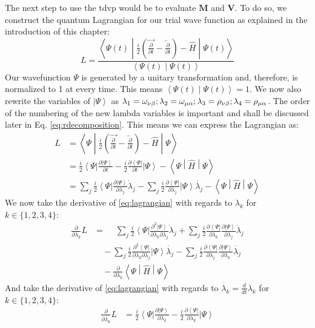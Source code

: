 \documentclass{aux/ttuthes2007}
\newcommand{\bra}[1]{\ensuremath{\left\langle#1\right\vert}}
\newcommand{\ket}[1]{\ensuremath{\left|#1\right\rangle}}
\newcommand{\braket}[2]{\left< #1 \middle\vert #2 \right>}
\newcommand{\sandwich}[3]{\left< #1 \middle\vert #2 \middle\vert #3 \right>}
\newcommand{\dd}[1]{\frac{d}{d#1}}
\newcommand{\pd}[1]{\frac{\partial}{\partial #1}}
\newcommand{\kpp}[1]{\frac{\partial \ket\Psi}{\partial #1}}
\newcommand{\bpp}[1]{\frac{\partial \bra\Psi}{\partial #1}}
\newcommand{\kppd}[2]{\frac{\partial^{2} \ket\Psi}{\partial #1 \partial #2}}
\newcommand{\bppd}[2]{\frac{\partial^{2} \bra\Psi}{\partial #1 \partial #2}}
\newcommand{\ind}[1]{{\uo #1 \oo #1}}
\newcommand{\uo}[1]{
		\IfEqCase{#1}{
			{0}{\mu}
			{1}{\nu}
			{2}{\xi}
		}[\PackageError{uo}{Undefined option to uo: #1}{}]
}
\newcommand{\oo}[1]{
		\IfEqCase{#1}{
			{0}{\alpha}
			{1}{\beta}
			{2}{\gamma}
		}[\PackageError{unocorb}{Undefined option to unuo: #1}{}]
}
\begin{document}
The next step to use the \gls{tdvp} would be to evaluate $\bm M$ and $\bm V$.
To do so, we construct the quantum Lagrangian for our trial wave function as explained in the introduction of this chapter:
\[
	L = \frac{\sandwich{\Psi(t)}{\frac{i}{2}\left(\overrightarrow{\pd t} - \overleftarrow{\pd t}\right) - \hat H}{\Psi(t)}}{\braket{\Psi(t)}{\Psi(t)}}
\]
%
Our wavefunction $\Psi$ is generated by a unitary transformation and, therefore, is normalized to 1 at every time. This means $\braket{\Psi(t)}{\Psi(t)} = 1$. We now also rewrite the variables of $\ket{\Psi}$ as 
$\lambda_1 = \omega_\ind 1; \lambda_2 = \omega_\ind 0; \lambda_3 = \rho_\ind 1; \lambda_4 = \rho_\ind 0$.
The order of the numbering of the new lambda variables is important and shall be discussed later in Eq. \ref{eq:rdecomposition}. 
This means we can express the Lagrangian as:
\begin{equation}
	\begin{split}
		\label{eq:lagrangian}
		L &= \sandwich{\Psi}{\frac{i}{2}\left(\overrightarrow{\pd t} - \overleftarrow{\pd t}\right) - \hat H}{\Psi} \\
		  &= \frac{i}{2}\bra{\Psi}{\kpp t} - \frac{i}{2}{\bpp{t}}\ket{\Psi} - \sandwich{\Psi}{\hat H}{\Psi} \\
		  &= 	
			\sum_j \frac{i}{2}\bra{\Psi}{\kpp {\lambda_j}} \dot \lambda_j
		- 	\sum_j \frac{i}{2}{\bpp{\lambda_j}}\ket{\Psi}\dot{\lambda_j}
		- \sandwich{\Psi}{\hat H}{\Psi}
	\end{split}
\end{equation}
%
We now take the derivative of \ref{eq:lagrangian} with regards to $\lambda_k$ for $k \in \{1, 2, 3, 4\}$:
%
\begin{equation*}
	\begin{split}
	\pd{\lambda_k} L &= 	
	\phantom{-}\sum_j \frac{i}{2}\bra{\Psi}{\kppd {\lambda_k}{\lambda_j}} \dot \lambda_j
	+	\sum_j \frac{i}{2}\bpp{\lambda_k}{\kpp {\lambda_j}} \dot \lambda_j \\
	&\quad -\sum_j \frac{i}{2}{\bppd{\lambda_k}{\lambda_j}}\ket{\Psi}\dot{\lambda_j}
	- 	\sum_j \frac{i}{2}{\bpp{\lambda_j}}\kpp{\lambda_k}\dot{\lambda_j}\\
	&\quad -\pd{\lambda_k} \sandwich{\Psi}{\hat H}{\Psi}
	\end{split}
\end{equation*}
%
And take the derivative of \ref{eq:lagrangian} with regards to $\dot{\lambda_k} = \dd{t} \lambda_k$ for $k \in \{1, 2, 3, 4\}$:
%
\begin{equation*}
	\begin{split}
		\label{eq:euler-lagrange}
		\pd{\dot{\lambda_k}} L &=
		\frac{i}{2}\bra{\Psi}{\kpp {\lambda_k}}
	- 	\frac{i}{2}{\bpp{\lambda_k}}\ket{\Psi}
	\end{split}
\end{equation*}
\end{document}
